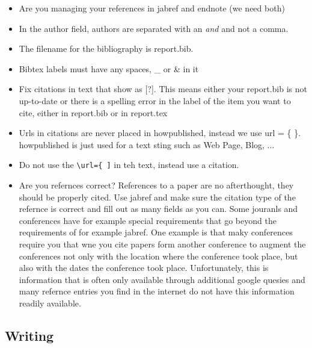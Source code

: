\begin{itemize}[label=$\Box$]
  \item Are you managing your references in jabref and endnote (we need
    both)
  \item In the author field, authors are separated with an {\em and}
    and not a comma.
  \item The filename for the bibliography is report.bib.
  \item Bibtex labels must have any spaces, \_ or \& in it
  \item Fix citations in text that show as [?]. This means either your
    report.bib is not up-to-date or there is a spelling error in the
    label of the item you want to cite, either in report.bib or in
    report.tex
  \item Urls in citations are never placed in howpublished, instead we
    use url = \{ \}. howpublished is just used for a text sting such
    as Web Page, Blog, ...
  \item Do not use the \verb|\url={ ]| in teh text, instead use a
      citation.
    \item Are you refernces correct? References to a paper are no
      afterthought, they should be properly cited. Use jabref and make
      sure the citation type of the refernce is correct and fill out
      as many fields as you can. Some jouranls and conferences have
      for example special requirements that go beyond the requirements
      of for example jabref. One example is that maky conferences
      require you that wne you cite papers form another conference to
      augment the conferences not only with the location where the
      conference took place, but also with the dates the conference
      took place. Unfortunately, this is information that is often
      only available through additional google quesies and many
      refernce entries you find in the internet do not have this
      information readily available.
\end{itemize}

\subsection{Writing}

